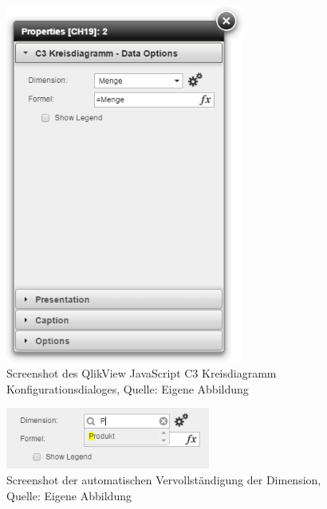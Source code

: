 \begin{appendix}
\begin{figure}[htbp]
	\centering
		\includegraphics[width=0.70\textwidth]{img/QvPropDialog/C3KreisdiagrammDialog.png}
	\caption[QlikView JavaScript C3 Kreisdiagramm Konfigurationsdialog]{Screenshot des QlikView JavaScript C3 Kreisdiagramm Konfigurationsdialoges, Quelle: Eigene Abbildung}
	\label{fig:QlikViewC3KreisdiagrammDialogScreenshot}
\end{figure}




\begin{figure}[htbp]
	\centering
		\includegraphics[width=0.60\textwidth]{img/QvPropDialog/DimensionAutomatischeVervollstaendigung.png}
		\caption[Automatischen Vervollständigung der Dimension]{Screenshot der automatischen Vervollständigung der Dimension, \\Quelle: Eigene Abbildung}
	\label{fig:DimensionAutomatischeVervollstaendigung}
\end{figure}




\end{appendix}
